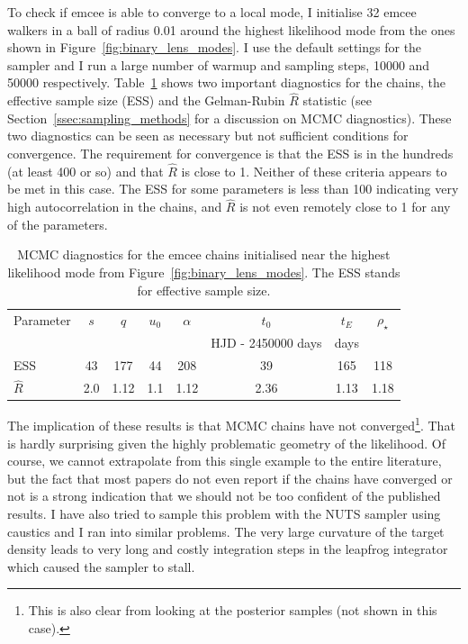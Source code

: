 \documentclass[12pt,dvipsnames]{report}
\newcommand{\ssf}[1]{\textsf{#1}}
\begin{document}
To check if \ssf{emcee} is able to converge to a local mode, I initialise 32 \ssf{emcee} walkers 
in a ball of radius 0.01 around the highest likelihood mode from the ones shown in 
Figure~\ref{fig:binary_lens_modes}. I use the default settings for the sampler and I run
a large number of warmup and sampling steps, 10000 and 50000 respectively. 
Table~\ref{tab:emcee_diagnostics} shows two important diagnostics for the chains, the effective 
sample size (ESS) and the Gelman-Rubin $\hat R$ statistic 
(see Section~\ref{ssec:sampling_methods} for a discussion on MCMC diagnostics). These two 
diagnostics can be seen as necessary but not sufficient conditions for convergence.
The requirement for convergence is that the ESS is in the hundreds (at least 400 or so) 
and that $\hat R$ is close to 1. Neither of these criteria appears to be met in this case. 
The ESS for some  parameters is less than 100 indicating very high autocorrelation in 
the chains, and $\hat R$ is not even remotely close to 1 for any of the parameters.  

\begin{table}[h!]
\centering
\begin{tabular}{lccccccc}
 \toprule
Parameter & $s$ & $q$ & $u_0$& $\alpha$& $t_0$& $t_E$& $\rho_\star$\\
&&&&&HJD - 2450000 days& days&\\
 \midrule
ESS & 43 & 177 & 44 & 208 & 39 & 165 & 118\\
$\hat R$ & 2.0 & 1.12 & 1.1 & 1.12 & 2.36 & 1.13 & 1.18\\
 \bottomrule
\end{tabular}
\caption{MCMC diagnostics for the \ssf{emcee} chains initialised near the highest likelihood
mode from Figure~\ref{fig:binary_lens_modes}. The ESS stands for effective sample size.}
\label{tab:emcee_diagnostics}
\end{table}

The implication of these results is that MCMC chains have not converged\footnote{This is also 
clear from looking at the posterior samples (not shown in this case).}. That is hardly 
surprising given the highly problematic geometry of the likelihood. 
Of course, we cannot extrapolate from this single example to the entire literature, but 
the fact that most papers do not even report if the chains have converged or not
is a strong indication that we should not be too confident of the published results. 
I have also tried to sample this problem with the NUTS sampler using \ssf{caustics} 
and I ran into similar problems. The very large curvature of the target density leads to very 
long and costly integration steps in the leapfrog integrator which caused the sampler 
to stall. 
\end{document}
